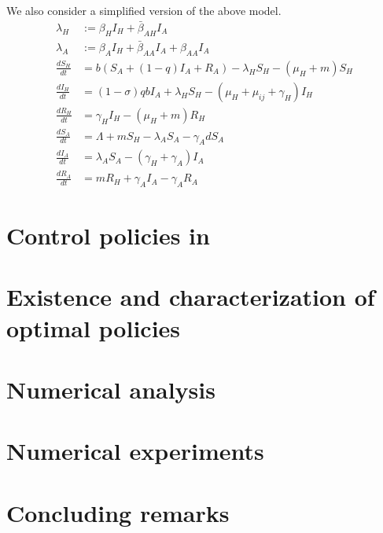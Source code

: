 \documentclass[11pt]{amsart}
\theoremstyle{definition}
\numberwithin{equation}{section}
\begin{document}
We also consider a simplified version of the above model.
    \begin{equation}
        \begin{aligned}
            \lambda_H &:= \beta_H I_H + \bar{\beta}_{AH} I_A
            \\
            \lambda_A &:= \beta_A I_H + \bar{\beta}_{AA} I_A
                + \beta_{AA} I_A
        \\
            \frac{d S_H}{dt} &=
            b (S_A + (1 - q) I_A + R_A)
            -\lambda_H S_H - (\mu_H + m) S_H 
        \\
            \frac{d I_H}{dt} &=
            (1 - \sigma)  q  b  I_A
            + \lambda_H S_H - (\mu_H + \mu_{ij} + \gamma_H)I_H
        \\
            \frac{d R_H}{dt} &=
            \gamma_H I_H - (\mu_H + m) R_H
        \\
            \frac{dS_A}{dt} &=
            \Lambda + m S_H - \lambda_A S_A - \gamma_A dS_A
        \\
            \frac{d I_A}{dt} &=
            \lambda_A S_A - (\gamma_H + \gamma_A)   I_A
        \\
            \frac{dR_A}{dt} &=
            m R_H + \gamma_A I_A - \gamma_A R_A
    \end{aligned}
\end{equation}

    \section{Control policies in }
    \section{Existence and characterization of optimal policies}
    \section{Numerical analysis}
    \section{Numerical experiments}
    \section{Concluding remarks}
%
%  
%  
\end{document}
